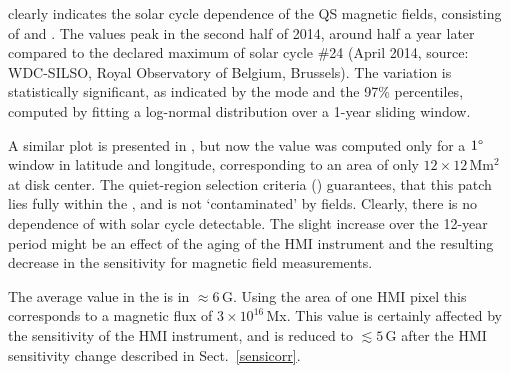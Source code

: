 \documentclass{aa}
\begin{document}
 clearly indicates the solar cycle dependence of the 
QS
magnetic fields, consisting of \NW{} and \IN{}. The \brms{} values peak in the second half of 2014, 
around half a year
later compared to the
declared maximum of solar cycle \#24 (April 2014, source: WDC-SILSO, Royal Observatory of Belgium, Brussels). The variation is statistically significant, as indicated by the mode and the 97\% percentiles, computed by fitting a log-normal distribution over a 1-year sliding window.

A similar plot is presented in , but now the \brms{} value was computed only for a $1\degree$ window in latitude and longitude, corresponding to an area of only $12\times 12$\,Mm$^2$ at disk center. The quiet-region selection criteria () guarantees, that this patch lies fully within the \IN{}, and is not `contaminated' by \NW{} fields. Clearly, there is no dependence of \brms{} with solar cycle detectable. The 
slight increase over the 12-year period might be an effect of the aging of the HMI instrument and the resulting decrease in the sensitivity for magnetic field measurements.

The average \brms{} value in the \IN{} is in $\approx6$\,G. Using the area of one HMI pixel this corresponds to a magnetic flux of $3\times 10^{16}$\,Mx. 
This value is certainly affected by the sensitivity of the HMI instrument, and is reduced to $\lesssim5$\,G after the HMI sensitivity change described in Sect.~\ref{sensicorr}.




\end{document}
